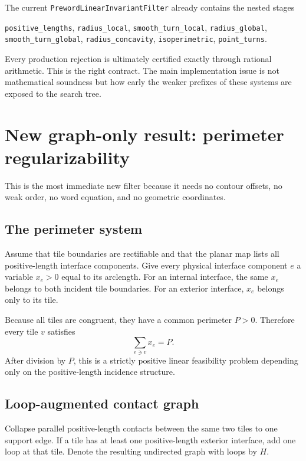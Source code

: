 \documentclass[11pt]{article}
\theoremstyle{definition}
\theoremstyle{remark}
\begin{document}
The current \texttt{PrewordLinearInvariantFilter} already contains the nested stages
\begin{center}
\texttt{positive\_lengths},
\texttt{radius\_local},
\texttt{smooth\_turn\_local},
\texttt{radius\_global},
\texttt{smooth\_turn\_global},
\texttt{radius\_concavity},
\texttt{isoperimetric},
\texttt{point\_turns}.
\end{center}
Every production rejection is ultimately certified exactly through rational arithmetic.  This is the right contract.  The main implementation issue is not mathematical soundness but how early the weaker prefixes of these systems are exposed to the search tree.

\section{New graph-only result: perimeter regularizability}
\label{sec:perimeter}

This is the most immediate new filter because it needs no contour offsets, no weak order, no word equation, and no geometric coordinates.

\subsection{The perimeter system}

Assume that tile boundaries are rectifiable and that the planar map lists all positive-length interface components.  Give every physical interface component $e$ a variable $x_e>0$ equal to its arclength.  For an internal interface, the same $x_e$ belongs to both incident tile boundaries.  For an exterior interface, $x_e$ belongs only to its tile.

Because all tiles are congruent, they have a common perimeter $P>0$.  Therefore every tile $v$ satisfies
\begin{equation}
  \sum_{e\ni v} x_e=P.                           \tag{3.1}
\end{equation}
After division by $P$, this is a strictly positive linear feasibility problem depending only on the positive-length incidence structure.

\subsection{Loop-augmented contact graph}

Collapse parallel positive-length contacts between the same two tiles to one support edge.  If a tile has at least one positive-length exterior interface, add one loop at that tile.  Denote the resulting undirected graph with loops by $H$.
\end{document}
